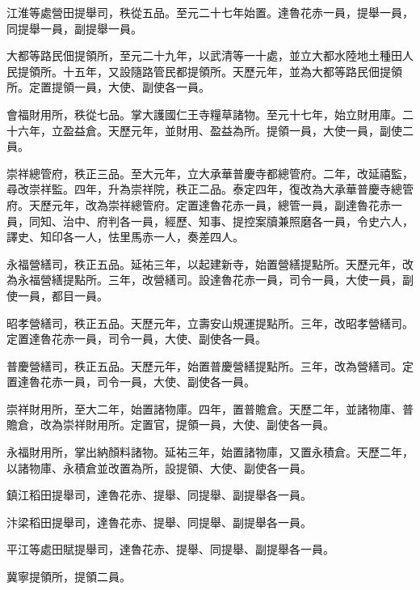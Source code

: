 \begin{pinyinscope}
 江淮等處營田提舉司，秩從五品。至元二十七年始置。達魯花赤一員，提舉一員，同提舉一員，副提舉一員。



 大都等路民佃提領所，至元二十九年，以武清等一十處，並立大都水陸地土種田人民提領所。十五年，又設隨路管民都提領所。天歷元年，並為大都等路民佃提領所。定置提領一員，大使、副使各一員。



 會福財用所，秩從七品。掌大護國仁王寺糧草諸物。至元十七年，始立財用庫。二十六年，立盈益倉。天歷元年，並財用、盈益為所。提領一員，大使一員，副使二員。



 崇祥總管府，秩正三品。至大元年，立大承華普慶寺都總管府。二年，改延禧監，尋改崇祥監。四年，升為崇祥院，秩正二品。泰定四年，復改為大承華普慶寺總管府。天歷元年，改為崇祥總管府。定置達魯花赤一員，總管一員，副達魯花赤一員，同知、治中、府判各一員，經歷、知事、提控案牘兼照磨各一員，令史六人，譯史、知印各一人，怯里馬赤一人，奏差四人。



 永福營繕司，秩正五品。延祐三年，以起建新寺，始置營繕提點所。天歷元年，改為永福營繕提點所。三年，改營繕司。設達魯花赤一員，司令一員，大使一員，副使一員，都目一員。



 昭孝營繕司，秩正五品。天歷元年，立壽安山規運提點所。三年，改昭孝營繕司。定置達魯花赤一員，司令一員，大使、副使各一員。



 普慶營繕司，秩正五品。天歷元年，始置普慶營繕提點所。三年，改為營繕司。定置達魯花赤一員，司令一員，大使、副使各一員。



 崇祥財用所，至大二年，始置諸物庫。四年，置普贍倉。天歷二年，並諸物庫、普贍倉，改為崇祥財用所。定置官，提領一員，大使、副使各一員。



 永福財用所，掌出納顏料諸物。延祐三年，始置諸物庫，又置永積倉。天歷二年，以諸物庫、永積倉並改置為所，設提領、大使、副使各一員。



 鎮江稻田提舉司，達魯花赤、提舉、同提舉、副提舉各一員。



 汴梁稻田提舉司，達魯花赤、提舉、同提舉、副提舉各一員。



 平江等處田賦提舉司，達魯花赤、提舉、同提舉、副提舉各一員。



 冀寧提領所，提領二員。




\end{pinyinscope}

